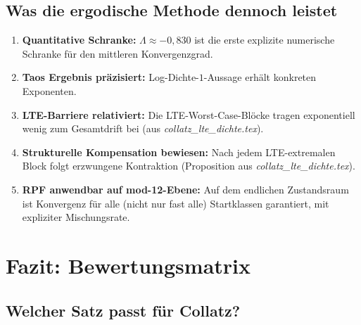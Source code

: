 \documentclass[12pt,a4paper]{article}
\begin{document}
\subsection{Was die ergodische Methode dennoch leistet}

\begin{tcolorbox}[ergebnis, title={Positive Leistungsbilanz der ergodischen Methode}]
\begin{enumerate}[label=(\arabic*)]
  \item \textbf{Quantitative Schranke:} $\Lambda \approx -0{,}830$ ist die
    erste explizite numerische Schranke für den mittleren Konvergenzgrad.
  \item \textbf{Taos Ergebnis präzisiert:} Log-Dichte-$1$-Aussage erhält
    konkreten Exponenten.
  \item \textbf{LTE-Barriere relativiert:} Die LTE-Worst-Case-Blöcke tragen
    exponentiell wenig zum Gesamtdrift bei (aus \textit{collatz\_lte\_dichte.tex}).
  \item \textbf{Strukturelle Kompensation bewiesen:} Nach jedem LTE-extremalen
    Block folgt erzwungene Kontraktion (Proposition aus \textit{collatz\_lte\_dichte.tex}).
  \item \textbf{RPF anwendbar auf mod-12-Ebene:} Auf dem endlichen
    Zustandsraum ist Konvergenz für alle (nicht nur fast alle) Startklassen
    garantiert, mit expliziter Mischungsrate.
\end{enumerate}
\end{tcolorbox}

\section{Fazit: Bewertungsmatrix}
\label{sec:fazit}

\subsection{Welcher Satz passt für Collatz?}
\end{document}
